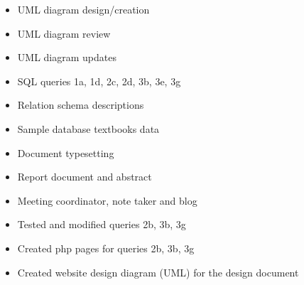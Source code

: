 \begin{itemize}
	\item UML diagram design/creation
	\item UML diagram review
	\item UML diagram updates
	\item SQL queries 1a, 1d, 2c, 2d, 3b, 3e, 3g
	\item Relation schema descriptions
	\item Sample database textbooks data
	\item Document typesetting
	\item Report document and abstract
	\item Meeting coordinator, note taker and blog
	\item Tested and modified queries 2b, 3b, 3g
	\item Created php pages for queries 2b, 3b, 3g
	\item Created website design diagram (UML) for the design document

\end{itemize}